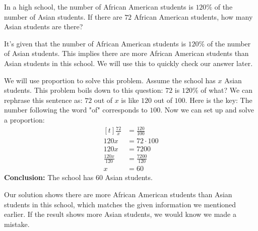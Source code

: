 \begin{myexample}
In a high school, the number of African American students is $120\%$ of the number of Asian students. If there are $72$ African American students, how many Asian students are there?
\end{myexample}
\begin{solution}
It's given that the number of African American students is $120\%$ of the number of Asian students. This implies there are more African American students than Asian students in this school. We will use this to quickly check our answer later.

We will use proportion to solve this problem. Assume the school has $x$ Asian students. This problem boils down to this question: $72$ is $120\%$ of what? We can rephrase this sentence as: $72$ out of $x$ is like $120$ out of $100$. Here is the key: The number following the word "of" corresponds to $100$. Now we can set up and solve a proportion:
\[
\begin{aligned}[t]
	\frac{72}{x} &= \frac{120}{100} \\
	120x &= 72 \cdot 100 \\
	120x &= 7200 \\
	\frac{120x}{120} &= \frac{7200}{120} \\
	x &= 60
\end{aligned}
\]
\textbf{Conclusion:} The school has $60$ Asian students.

Our solution shows there are more African American students than Asian students in this school, which matches the given information we mentioned earlier. If the result shows more Asian students, we would know we made a mistake.
\end{solution}


